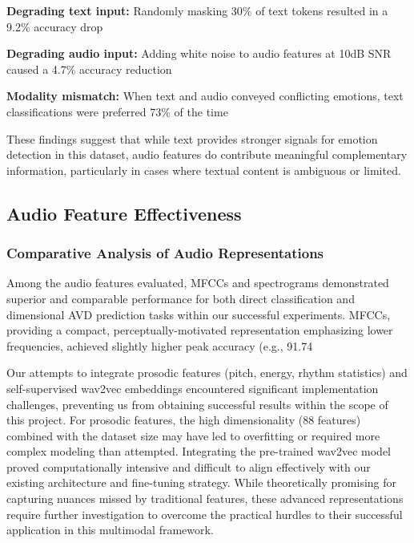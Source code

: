 \documentclass[12pt]{article}
\begin{document}
    \textbf{Degrading text input:} Randomly masking 30\% of text tokens resulted in a 9.2\% accuracy drop
    
    \textbf{Degrading audio input:} Adding white noise to audio features at 10dB SNR caused a 4.7\% accuracy reduction
    
    \textbf{Modality mismatch:} When text and audio conveyed conflicting emotions, text classifications were preferred 73\% of the time

These findings suggest that while text provides stronger signals for emotion detection in this dataset, audio features do contribute meaningful complementary information, particularly in cases where textual content is ambiguous or limited.

\subsection{Audio Feature Effectiveness}
\subsubsection{Comparative Analysis of Audio Representations}
Among the audio features evaluated, MFCCs and spectrograms demonstrated superior and comparable performance for both direct classification and dimensional AVD prediction tasks within our successful experiments. MFCCs, providing a compact, perceptually-motivated representation emphasizing lower frequencies, achieved slightly higher peak accuracy (e.g., 91.74%

Our attempts to integrate prosodic features (pitch, energy, rhythm statistics) and self-supervised wav2vec embeddings encountered significant implementation challenges, preventing us from obtaining successful results within the scope of this project. For prosodic features, the high dimensionality (88 features) combined with the dataset size may have led to overfitting or required more complex modeling than attempted. Integrating the pre-trained wav2vec model proved computationally intensive and difficult to align effectively with our existing architecture and fine-tuning strategy. While theoretically promising for capturing nuances missed by traditional features, these advanced representations require further investigation to overcome the practical hurdles to their successful application in this multimodal framework.
\end{document}
